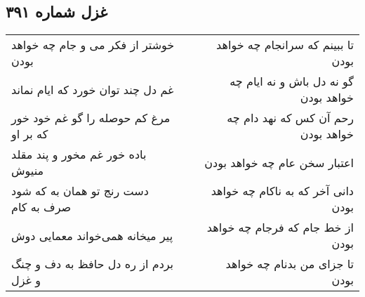 \begin{center}
\section*{غزل شماره ۳۹۱}
\label{sec:sh391}
\begin{longtable}{l p{0.5cm} r}
خوشتر از فکر می و جام چه خواهد بودن
&&
تا ببینم که سرانجام چه خواهد بودن
\\
غم دل چند توان خورد که ایام نماند
&&
گو نه دل باش و نه ایام چه خواهد بودن
\\
مرغ کم حوصله را گو غم خود خور که بر او
&&
رحم آن کس که نهد دام چه خواهد بودن
\\
باده خور غم مخور و پند مقلد منیوش
&&
اعتبار سخن عام چه خواهد بودن
\\
دست رنج تو همان به که شود صرف به کام
&&
دانی آخر که به ناکام چه خواهد بودن
\\
پیر میخانه همی‌خواند معمایی دوش
&&
از خط جام که فرجام چه خواهد بودن
\\
بردم از ره دل حافظ به دف و چنگ و غزل
&&
تا جزای من بدنام چه خواهد بودن
\\
\end{longtable}
\end{center}
